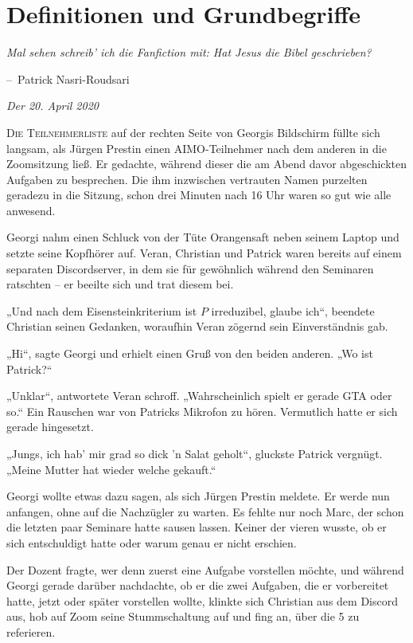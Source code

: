 \documentclass[oneside]{memoir}
\makeatletter
\newenvironment{chapquote}[2][2em]
  {\setlength{\@tempdima}{#1}%
   \def\chapquote@author{#2}%
   \parshape 1 \@tempdima \dimexpr\textwidth-2\@tempdima\relax%
   \itshape}
  {\par\normalfont\hfill--\ \chapquote@author\hspace*{\@tempdima}\par\bigskip}
\makeatother
\begin{document}
\chapter{Definitionen und Grundbegriffe} %
\begin{chapquote}{Patrick Nasri-Roudsari}
\glqq Mal sehen schreib' ich die Fanfiction mit: Hat Jesus die Bibel geschrieben?\grqq
\end{chapquote}

\textit{Der 20. April 2020}

\lettrine{D}{ie Teilnehmerliste} auf der rechten Seite von Georgis Bildschirm füllte sich langsam, als Jürgen Prestin einen AIMO-Teilnehmer nach dem anderen in die Zoomsitzung ließ. Er gedachte, während dieser die am Abend davor abgeschickten Aufgaben zu besprechen. Die ihm inzwischen vertrauten Namen purzelten geradezu in die Sitzung, schon drei Minuten nach 16 Uhr waren so gut wie alle anwesend.

Georgi nahm einen Schluck von der Tüte Orangensaft neben seinem Laptop und setzte seine Kopfhörer auf. Veran, Christian und Patrick waren bereits auf einem separaten Discordserver, in dem sie für gewöhnlich während den Seminaren ratschten – er beeilte sich und trat diesem bei.

„Und nach dem Eisensteinkriterium ist $P$ irreduzibel, glaube ich“, beendete Christian seinen Gedanken, woraufhin Veran zögernd sein Einverständnis gab.

„Hi“, sagte Georgi und erhielt einen Gruß von den beiden anderen. „Wo ist Patrick?“

„Unklar“, antwortete Veran schroff. „Wahrscheinlich spielt er gerade GTA oder so.“ Ein Rauschen war von Patricks Mikrofon zu hören. Vermutlich hatte er sich gerade hingesetzt.

„Jungs, ich hab' mir grad so dick 'n Salat geholt“, gluckste Patrick vergnügt. „Meine Mutter hat wieder welche gekauft.“

Georgi wollte etwas dazu sagen, als sich Jürgen Prestin meldete. Er werde nun anfangen, ohne auf die Nachzügler zu warten. Es fehlte nur noch Marc, der schon die letzten paar Seminare hatte sausen lassen. Keiner der vieren wusste, ob er sich entschuldigt hatte oder warum genau er nicht erschien.

Der Dozent fragte, wer denn zuerst eine Aufgabe vorstellen möchte, und während Georgi gerade darüber nachdachte, ob er die zwei Aufgaben, die er vorbereitet hatte, jetzt oder später vorstellen wollte, klinkte sich Christian aus dem Discord aus, hob auf Zoom seine Stummschaltung auf und fing an, über die 5 zu referieren. 
\end{document}
